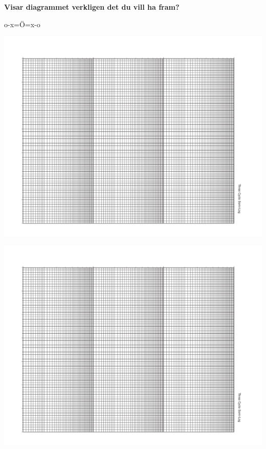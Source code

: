 \documentclass[onepage,swedish,a4paper,12pt]{scrbook}
\begin{document}
\begin{center}\textbf{Visar diagrammet verkligen det du vill ha fram?}\end{center}

\begin{center}

o-x=Ö=x-o
\end{center}


\hspace{-20mm}\includegraphics[angle=90,scale=0.85]{linlog-papper.pdf}

\includegraphics[angle=90,scale=0.85]{linlog-papper.pdf}
\end{document}
